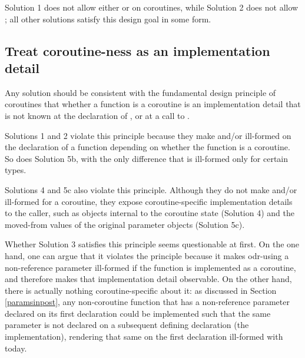 Solution 1 does not allow either  or  on coroutines, while Solution 2 does not allow ; all other solutions satisfy this design goal in some form.

\subsection{Treat coroutine-ness as an implementation detail}
\label{goal_coro_principle}

Any solution should be consistent with the fundamental design principle of coroutines that whether a function  is a coroutine is an implementation detail that is not known at the declaration of , or at a call to .

Solutions 1 and 2 violate this principle because they make  and/or  ill-formed on the declaration of a function depending on whether the function is a coroutine. So does Solution 5b, with the only difference that  is ill-formed only for certain types. 

Solutions 4 and 5c also violate this principle. Although they do not make  and/or  ill-formed for a coroutine, they expose coroutine-specific implementation details to the caller, such as objects internal to the coroutine state (Solution 4) and the moved-from values of the original parameter objects (Solution 5c).

Whether Solution 3 satisfies this principle seems questionable at first. On the one hand, one can argue that it violates the principle because it makes odr-using a  non-reference parameter ill-formed if the function is implemented as a coroutine, and therefore makes that implementation detail observable. On the other hand, there is actually nothing coroutine-specific about it: as discussed in Section \ref{paramsinpost}, any non-coroutine function that has a non-reference parameter declared  on its first declaration could be implemented such that the same parameter is not declared  on a subsequent defining declaration (the implementation), rendering that same  on the first declaration ill-formed with \cite{P2900R8} today.

